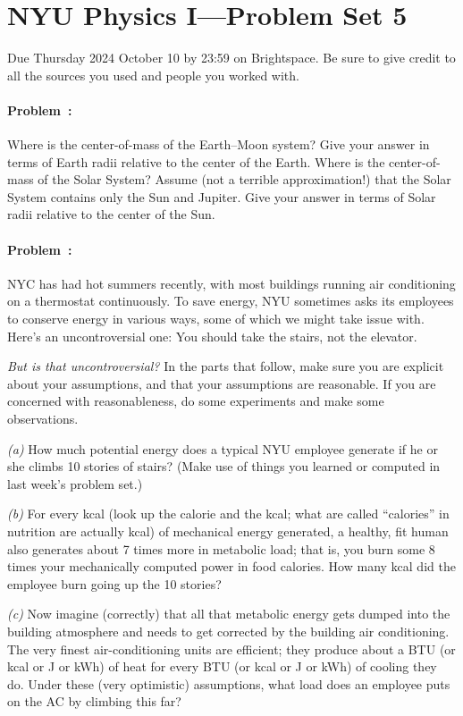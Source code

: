 \documentclass[12pt]{article}
\begin{document}
\section*{NYU Physics I---Problem Set 5}

Due Thursday 2024 October 10 by 23:59 on Brightspace. Be sure to give
credit to all the sources you used and people you worked with.

\paragraph{Problem~\theproblem:}%
Where is the center-of-mass of the Earth--Moon system? Give your
answer in terms of Earth radii relative to the center of the
Earth. Where is the center-of-mass of the Solar System? Assume (not a
terrible approximation!) that the Solar System contains only the Sun
and Jupiter. Give your answer in terms of Solar radii relative to the
center of the Sun.

\paragraph{Problem~\theproblem:}%
NYC has had hot summers recently, with most buildings running air
conditioning on a thermostat continuously. To save energy, NYU sometimes
asks its employees to conserve energy in various ways, some of which we
might take issue with. Here's an uncontroversial one: You should take
the stairs, not the elevator.

\emph{But is that uncontroversial?}  In the parts that follow, make
sure you are explicit about your assumptions, and that your
assumptions are reasonable. If you are concerned with reasonableness,
do some experiments and make some observations.

\textsl{(a)} How much potential energy does a typical NYU employee
generate if he or she climbs 10 stories of stairs? (Make use of things
you learned or computed in last week's problem set.)

\textsl{(b)} For every kcal (look up the calorie and the kcal; what
are called ``calories'' in nutrition are actually kcal) of mechanical
energy generated, a healthy, fit human also generates about 7 times
more in metabolic load; that is, you burn some 8 times your
mechanically computed power in food calories. How many kcal did the
employee burn going up the 10 stories?

\textsl{(c)} Now imagine (correctly) that all that metabolic energy
gets dumped into the building atmosphere and needs to get corrected by
the building air conditioning. The very finest air-conditioning units are
efficient; they produce about a BTU (or kcal or J or kWh) of heat
for every BTU (or kcal or J or kWh) of cooling they do. Under these
(very optimistic)
assumptions, what load does an employee puts on the AC by climbing this far?
\end{document}
